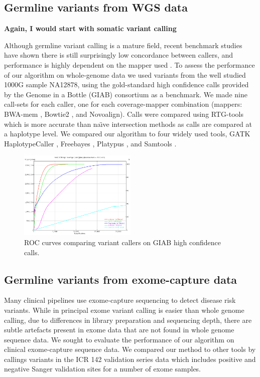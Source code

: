 \documentclass[notitlepage, twocolumn]{article}
\begin{document}
\subsection*{Germline variants from WGS data}

{\bf Again, I would start with somatic variant calling}

Although germline variant calling is a mature field, recent benchmark studies have shown there is still surprisingly low concordance between callers, and performance is highly dependent on the mapper used \cite{giab-comp1, giab-comp2}. To assess the performance of our algorithm on whole-genome data we used variants from the well studied 1000G sample NA12878, using the gold-standard high confidence calls provided by the Genome in a Bottle (GIAB) consortium \cite{giab} as a benchmark. We made nine call-sets for each caller, one for each coverage-mapper combination (mappers: BWA-mem \cite{bwa-mem}, Bowtie2 \cite{bowtie2}, and Novoalign). Calls were compared using RTG-tools \cite{rtg-tools} which is more accurate than na\"\i ve intersection methods as calls are compared at a haplotype level. We compared our algorithm to four widely used tools, GATK HaplotypeCaller \cite{gatk}, Freebayes \cite{freebayes}, Platypus \cite{platypus}, and Samtools \cite{samtools}. 

\begin{figure}[h]
\centering
\includegraphics[width=0.5\textwidth]{figures/giab-benchmark}
\caption{ROC curves comparing variant callers on GIAB high confidence calls.}
\label{fig:giab}
\vspace{-1.5em}
\end{figure}

\subsection*{Germline variants from exome-capture data}

Many clinical pipelines use exome-capture sequencing to detect disease risk variants. While in principal exome variant calling is easier than whole genome calling, due to differences in library preparation and sequencing depth, there are subtle artefacts present in exome data that are not found in whole genome sequence data. We sought to evaluate the performance of our algorithm on clinical exome-capture sequence data. We compared our method to other tools by callings variants in the ICR 142 validation series data \cite{icr142} which includes positive and negative Sanger validation sites for a number of exome samples.
\end{document}

